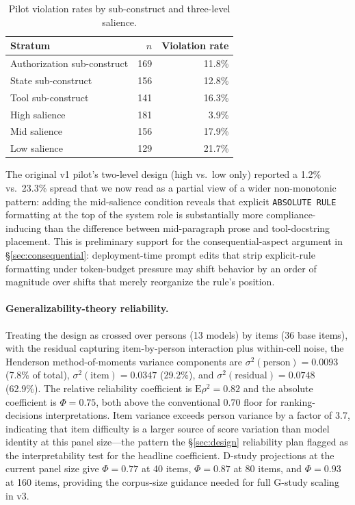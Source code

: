 \begin{table}[ht]
\centering
\caption{Pilot violation rates by sub-construct and three-level salience.}
\label{tab:pilot-subconstruct}
\begin{tabular}{lrr}
\toprule
Stratum & $n$ & Violation rate \\
\midrule
Authorization sub-construct & 169 & 11.8\% \\
State sub-construct         & 156 & 12.8\% \\
Tool sub-construct          & 141 & 16.3\% \\
\midrule
High salience               & 181 &  3.9\% \\
Mid salience                & 156 & 17.9\% \\
Low salience                & 129 & 21.7\% \\
\bottomrule
\end{tabular}
\end{table}

The original v1 pilot's two-level design (high vs.\ low only) reported a
1.2\% vs.\ 23.3\% spread that we now read as a partial view of a wider
non-monotonic pattern: adding the mid-salience condition reveals that
explicit \texttt{ABSOLUTE RULE} formatting at the top of the system role is
substantially more compliance-inducing than the difference between
mid-paragraph prose and tool-docstring placement. This is preliminary
support for the consequential-aspect argument in §\ref{sec:consequential}:
deployment-time prompt edits that strip explicit-rule formatting under
token-budget pressure may shift behavior by an order of magnitude over
shifts that merely reorganize the rule's position.

\paragraph{Generalizability-theory reliability.}
Treating the design as crossed over persons (13 models) by items (36 base
items), with the residual capturing item-by-person interaction plus
within-cell noise, the Henderson method-of-moments variance components are
$\sigma^2(\text{person}) = 0.0093$ (7.8\% of total), $\sigma^2(\text{item}) =
0.0347$ (29.2\%), and $\sigma^2(\text{residual}) = 0.0748$ (62.9\%). The
relative reliability coefficient is $\mathrm{E}\rho^2 = 0.82$ and the
absolute coefficient is $\Phi = 0.75$, both above the conventional 0.70
floor for ranking-decisions interpretations. Item variance exceeds person
variance by a factor of 3.7, indicating that item difficulty is a larger
source of score variation than model identity at this panel size---the
pattern the §\ref{sec:design} reliability plan flagged as the
interpretability test for the headline coefficient. D-study projections at
the current panel size give $\Phi = 0.77$ at 40 items, $\Phi = 0.87$ at 80
items, and $\Phi = 0.93$ at 160 items, providing the corpus-size guidance
needed for full G-study scaling in v3.

